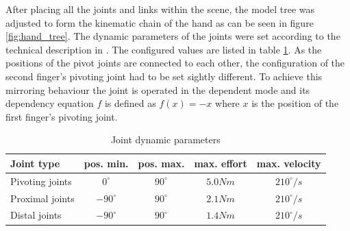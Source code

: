 After placing all the joints and links within the scene, the model tree was adjusted to form the kinematic chain of the hand as can be seen in figure \ref{fig:hand_tree}. The dynamic parameters of the joints were set according to the technical description in \citep{schunk2010}. The configured values are listed in table \ref{tbl:tech_data}. As the positions of the pivot joints are connected to each other, the configuration of the second finger's pivoting joint had to be set sightly different. To achieve this mirroring behaviour the joint is operated in the dependent mode and its dependency equation $f$ is defined as $f(x) = -x$ where $x$ is the position of the first finger's pivoting joint.
\begin{table}[h]
  \centering
  \begin{tabular}[h]{|l|c|c|c|c|} \hline
	\textbf{Joint type} & \textbf{pos. min.} & \textbf{pos. max.} & \textbf{max. effort} & \textbf{max. velocity} \\ \hline
	Pivoting joints & $0^{\circ}$ & $90^{\circ}$ & $5.0 Nm$ & $210^{\circ}/s$ \\
	Proximal joints & $-90^{\circ}$ & $90^{\circ}$ & $2.1 Nm$ & $210^{\circ}/s$ \\
	Distal joints & $-90^{\circ}$ & $90^{\circ}$ & $1.4 Nm$ & $210^{\circ}/s$ \\ \hline
  \end{tabular}
  \caption{Joint dynamic parameters}
  \label{tbl:tech_data}
\end{table} \\


